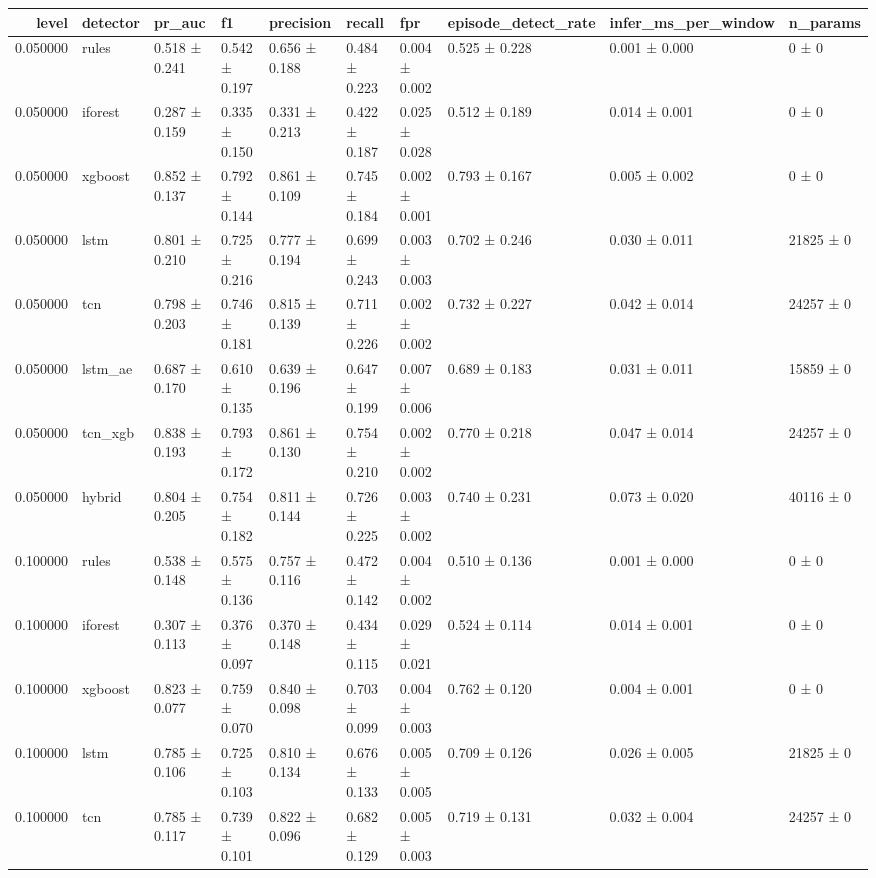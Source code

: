 \begin{tabular}{rlllllllll}
\toprule
level & detector & pr\_auc & f1 & precision & recall & fpr & episode\_detect\_rate & infer\_ms\_per\_window & n\_params \\
\midrule
0.050000 & rules & 0.518 ± 0.241 & 0.542 ± 0.197 & 0.656 ± 0.188 & 0.484 ± 0.223 & 0.004 ± 0.002 & 0.525 ± 0.228 & 0.001 ± 0.000 & 0 ± 0 \\
0.050000 & iforest & 0.287 ± 0.159 & 0.335 ± 0.150 & 0.331 ± 0.213 & 0.422 ± 0.187 & 0.025 ± 0.028 & 0.512 ± 0.189 & 0.014 ± 0.001 & 0 ± 0 \\
0.050000 & xgboost & 0.852 ± 0.137 & 0.792 ± 0.144 & 0.861 ± 0.109 & 0.745 ± 0.184 & 0.002 ± 0.001 & 0.793 ± 0.167 & 0.005 ± 0.002 & 0 ± 0 \\
0.050000 & lstm & 0.801 ± 0.210 & 0.725 ± 0.216 & 0.777 ± 0.194 & 0.699 ± 0.243 & 0.003 ± 0.003 & 0.702 ± 0.246 & 0.030 ± 0.011 & 21825 ± 0 \\
0.050000 & tcn & 0.798 ± 0.203 & 0.746 ± 0.181 & 0.815 ± 0.139 & 0.711 ± 0.226 & 0.002 ± 0.002 & 0.732 ± 0.227 & 0.042 ± 0.014 & 24257 ± 0 \\
0.050000 & lstm\_ae & 0.687 ± 0.170 & 0.610 ± 0.135 & 0.639 ± 0.196 & 0.647 ± 0.199 & 0.007 ± 0.006 & 0.689 ± 0.183 & 0.031 ± 0.011 & 15859 ± 0 \\
0.050000 & tcn\_xgb & 0.838 ± 0.193 & 0.793 ± 0.172 & 0.861 ± 0.130 & 0.754 ± 0.210 & 0.002 ± 0.002 & 0.770 ± 0.218 & 0.047 ± 0.014 & 24257 ± 0 \\
0.050000 & hybrid & 0.804 ± 0.205 & 0.754 ± 0.182 & 0.811 ± 0.144 & 0.726 ± 0.225 & 0.003 ± 0.002 & 0.740 ± 0.231 & 0.073 ± 0.020 & 40116 ± 0 \\
0.100000 & rules & 0.538 ± 0.148 & 0.575 ± 0.136 & 0.757 ± 0.116 & 0.472 ± 0.142 & 0.004 ± 0.002 & 0.510 ± 0.136 & 0.001 ± 0.000 & 0 ± 0 \\
0.100000 & iforest & 0.307 ± 0.113 & 0.376 ± 0.097 & 0.370 ± 0.148 & 0.434 ± 0.115 & 0.029 ± 0.021 & 0.524 ± 0.114 & 0.014 ± 0.001 & 0 ± 0 \\
0.100000 & xgboost & 0.823 ± 0.077 & 0.759 ± 0.070 & 0.840 ± 0.098 & 0.703 ± 0.099 & 0.004 ± 0.003 & 0.762 ± 0.120 & 0.004 ± 0.001 & 0 ± 0 \\
0.100000 & lstm & 0.785 ± 0.106 & 0.725 ± 0.103 & 0.810 ± 0.134 & 0.676 ± 0.133 & 0.005 ± 0.005 & 0.709 ± 0.126 & 0.026 ± 0.005 & 21825 ± 0 \\
0.100000 & tcn & 0.785 ± 0.117 & 0.739 ± 0.101 & 0.822 ± 0.096 & 0.682 ± 0.129 & 0.005 ± 0.003 & 0.719 ± 0.131 & 0.032 ± 0.004 & 24257 ± 0 \\

\end{tabular}
